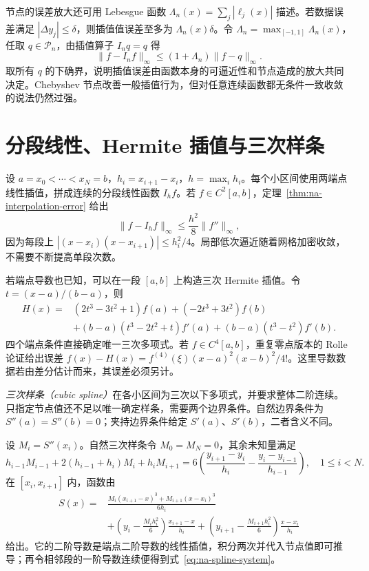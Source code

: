 节点的误差放大还可用 Lebesgue 函数 $\Lambda_n(x)=\sum_j|\ell_j(x)|$ 描述。若数据误差满足 $|\Delta y_j|\le\delta$，则插值值误差至多为 $\Lambda_n(x)\delta$。令 $\Lambda_n=\max_{[-1,1]}\Lambda_n(x)$，任取 $q\in\mathcal P_n$，由插值算子 $I_nq=q$ 得
\[
 \|f-I_nf\|_\infty\le(1+\Lambda_n)\|f-q\|_\infty.
\]
取所有 $q$ 的下确界，说明插值误差由函数本身的可逼近性和节点造成的放大共同决定。Chebyshev 节点改善一般插值行为，但对任意连续函数都无条件一致收敛的说法仍然过强。

\section{分段线性、Hermite 插值与三次样条}
设 $a=x_0<\cdots<x_N=b$，$h_i=x_{i+1}-x_i$，$h=\max_i h_i$。每个小区间使用两端点线性插值，拼成连续的分段线性函数 $I_hf$。若 $f\in C^2[a,b]$，定理~\ref{thm:na-interpolation-error} 给出
\[
 \|f-I_hf\|_\infty\le\frac{h^2}{8}\|f''\|_\infty,
\]
因为每段上 $|(x-x_i)(x-x_{i+1})|\le h_i^2/4$。局部低次逼近随着网格加密收敛，不需要不断提高单段次数。

若端点导数也已知，可以在一段 $[a,b]$ 上构造三次 Hermite 插值。令 $t=(x-a)/(b-a)$，则
\begin{align*}
 H(x)={}&(2t^3-3t^2+1)f(a)+(-2t^3+3t^2)f(b)\\
 &+(b-a)(t^3-2t^2+t)f'(a)+(b-a)(t^3-t^2)f'(b).
\end{align*}
四个端点条件直接确定唯一三次多项式。若 $f\in C^4[a,b]$，重复零点版本的 Rolle 论证给出误差 $f(x)-H(x)=f^{(4)}(\xi)(x-a)^2(x-b)^2/4!$。这里导数数据若由差分估计而来，其误差必须另计。

\emph{三次样条（cubic spline）}在各小区间为三次以下多项式，并要求整体二阶连续。只指定节点值还不足以唯一确定样条，需要两个边界条件。自然边界条件为 $S''(a)=S''(b)=0$；夹持边界条件给定 $S'(a)$、$S'(b)$，二者含义不同。

设 $M_i=S''(x_i)$。自然三次样条令 $M_0=M_N=0$，其余未知量满足
\begin{equation}
 h_{i-1}M_{i-1}+2(h_{i-1}+h_i)M_i+h_iM_{i+1}
 =6\left(\frac{y_{i+1}-y_i}{h_i}-\frac{y_i-y_{i-1}}{h_{i-1}}\right),
 \quad 1\le i<N.
 \label{eq:na-spline-system}
\end{equation}
在 $[x_i,x_{i+1}]$ 内，函数由
\begin{align*}
 S(x)={}&\frac{M_i(x_{i+1}-x)^3+M_{i+1}(x-x_i)^3}{6h_i}\\
 &+\left(y_i-\frac{M_ih_i^2}{6}\right)\frac{x_{i+1}-x}{h_i}
 +\left(y_{i+1}-\frac{M_{i+1}h_i^2}{6}\right)\frac{x-x_i}{h_i}
\end{align*}
给出。它的二阶导数是端点二阶导数的线性插值，积分两次并代入节点值即可推导；再令相邻段的一阶导数连续便得到式~\eqref{eq:na-spline-system}。

